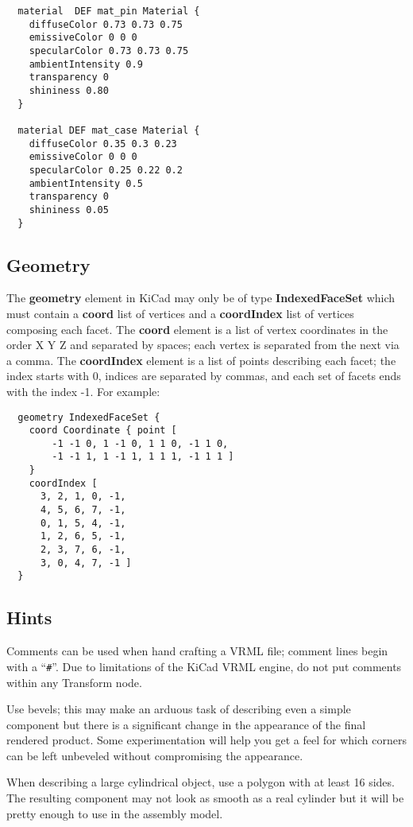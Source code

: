 \documentclass[a4paper]{article}
\begin{document}
\begin{verbatim}
  material  DEF mat_pin Material {
    diffuseColor 0.73 0.73 0.75
    emissiveColor 0 0 0
    specularColor 0.73 0.73 0.75
    ambientIntensity 0.9
    transparency 0
    shininess 0.80
  }

  material DEF mat_case Material {
    diffuseColor 0.35 0.3 0.23
    emissiveColor 0 0 0
    specularColor 0.25 0.22 0.2
    ambientIntensity 0.5
    transparency 0
    shininess 0.05
  }
\end{verbatim}

\subsection{Geometry}
The \textbf{geometry} element in KiCad may only be of type \textbf{IndexedFaceSet} which must contain a
\textbf{coord} list of vertices and a \textbf{coordIndex} list of vertices composing each facet.
The \textbf{coord} element is a list of vertex coordinates in the order X Y Z and separated by spaces;
each vertex is separated from the next via a comma. The \textbf{coordIndex} element is a list of points
describing each facet; the index starts with 0, indices are separated by commas, and each set of facets
ends with the index -1. For example:

\begin{verbatim}
  geometry IndexedFaceSet {
    coord Coordinate { point [
        -1 -1 0, 1 -1 0, 1 1 0, -1 1 0,
        -1 -1 1, 1 -1 1, 1 1 1, -1 1 1 ]
    }
    coordIndex [
      3, 2, 1, 0, -1,
      4, 5, 6, 7, -1,
      0, 1, 5, 4, -1,
      1, 2, 6, 5, -1,
      2, 3, 7, 6, -1,
      3, 0, 4, 7, -1 ]
  }
\end{verbatim}

\subsection{Hints}
Comments can be used when hand crafting a VRML file; comment lines begin with a ``\verb~#~''. Due to
limitations of the KiCad VRML engine, do not put comments within any Transform node.

Use bevels; this may make an arduous task of describing even a simple component but there is a significant
change in the appearance of the final rendered product. Some experimentation will help you get a feel for
which corners can be left unbeveled without compromising the appearance.

When describing a large cylindrical object, use a polygon with at least 16 sides. The resulting component
may not look as smooth as a real cylinder but it will be pretty enough to use in the assembly model.
\end{document}
